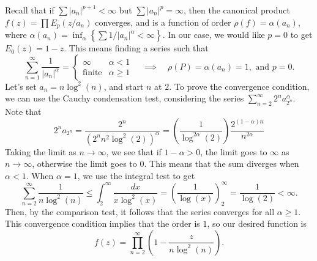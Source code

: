 \documentclass{pset}
\begin{document}
\begin{solution}
  Recall that if $\sum |a_n|^{p+1}<\infty$ but $\sum |a_n|^p=\infty$, then the canonical product $f(z)=\prod E_p(z/a_n)$ converges, and is a function of order $\rho(f) = \alpha(a_n)$, where $\alpha(a_n)=\inf_\alpha \left\{ \sum 1/|a_n|^\alpha < \infty\right\}$. In our case, we would like $p=0$ to get $E_0(z)=1-z$. This means finding a series such that
  \[
    \sum^\infty_{n=1} \frac{1}{|a_n|^\alpha} = \begin{cases} \infty & \alpha < 1\\
    \textrm{finite} & \alpha \geq 1\end{cases}\quad\implies\quad \rho(P)=\alpha(a_n)=1, \textrm{ and } p=0.
  \]
  Let's set $a_n = n\log^2(n)$, and start $n$ at $2$. 
  To prove the convergence condition, we can use the Cauchy condensation test, considering the series $\sum_{n=2}^\infty 2^n a_{2^n}^\alpha$. Note that
  \[2^n a_{2^n} = \frac{2^n}{(2^n n^2 \log^2(2))^\alpha} = \left(\frac{1}{\log^{2\alpha}(2)}\right)\frac{2^{(1-\alpha)n}}{n^{2\alpha}}\]
  Taking the limit as $n\to \infty$, we see that if $1-\alpha > 0$, the limit goes to $\infty$ as $n\to \infty$, otherwise the limit goes to $0$. This means that the sum diverges when $\alpha < 1$. When $\alpha=1$, we use the integral test to get 
  \[
    \sum^\infty_{n=2} \frac{1}{n\log^2(n)} \leq \int_2^\infty \frac{dx}{x\log^2(x)} = \left(\frac{1}{\log(x)}\right)^\infty_{2} = \frac{1}{\log(2)}<\infty.
  \]
  Then, by the comparison test, it follows that the series converges for all $\alpha\geq 1$. 
  This convergence condition implies that the order is $1$, so our desired function is 
  \[
    f(z) = \prod^\infty_{n=2}\left(1-\frac{z}{n\log^2(n)}\right).
  \]
\end{solution}
\end{document}
